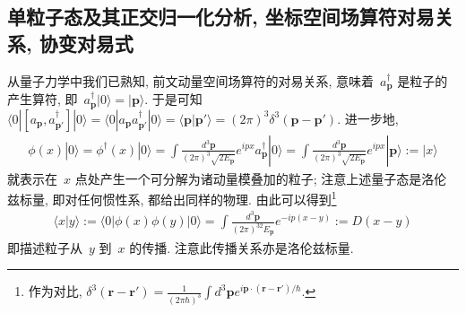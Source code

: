 \subsection{单粒子态及其正交归一化分析, 坐标空间场算符对易关系, 协变对易式}


从量子力学中我们已熟知, 前文动量空间场算符的对易关系, 意味着~$a^\dag_{\bm{p}}$ 是粒子的产生算符, 即~$a^\dag_{\bm{p}}|0\rangle=|\bm{p}\rangle$. 于是可知~$\langle0|[a_{\bm{p}},a^\dag_{\bm{p}'}]|0\rangle=\langle0|a_{\bm{p}}a^\dag_{\bm{p}'}|0\rangle=\langle\bm{p}|\bm{p}'\rangle=(2\pi)^3\delta^3(\bm{p}-\bm{p}')$. 进一步地,
\begin{align}
\phi(x)|0\rangle=\phi^\dag(x)|0\rangle=\int\frac{d^3\bm{p}}{(2\pi)^3\sqrt{2E_{\bm{p}}}}e^{ipx}a^\dag_{\bm{p}}|0\rangle
=\int\frac{d^3\bm{p}}{(2\pi)^3\sqrt{2E_{\bm{p}}}}e^{ipx}|\bm{p}\rangle:=|x\rangle
\end{align}
就表示在~$x$ 点处产生一个可分解为诸动量模叠加的粒子; 注意上述量子态是洛伦兹标量, 即对任何惯性系, 都给出同样的物理. 由此可以得到\footnote{作为对比, $\delta^3(\bm{r}-\bm{r}')=\frac{1}{(2\pi\hbar)^3}\int d^3\bm{p}e^{i\bm{p}\cdot(\bm{r}-\bm{r}')/\hbar}$.}
\begin{align}
\langle x|y\rangle:=\langle0|\phi(x)\phi(y)|0\rangle=\int\frac{d^3\bm{p}}{(2\pi)^32E_{\bm{p}}}e^{-ip(x-y)}:=D(x-y)
\end{align}
即描述粒子从~$y$ 到~$x$ 的传播. 注意此传播关系亦是洛伦兹标量.

